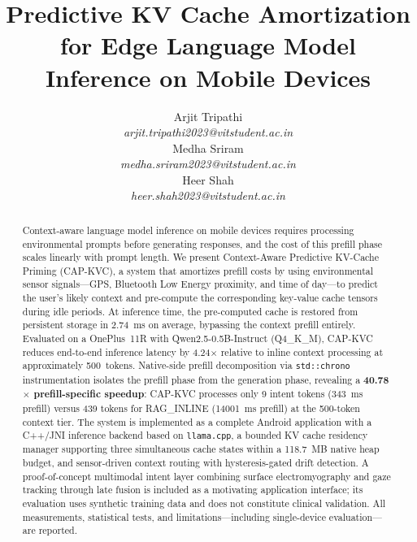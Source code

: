 \documentclass[journal]{IEEEtran}
\begin{document}
\title{Predictive KV Cache Amortization for Edge Language Model Inference on Mobile Devices}

\author{
\centering
Arjit Tripathi\\
\textit{arjit.tripathi2023@vitstudent.ac.in}

\vspace{1em}

\begin{minipage}[t]{0.45\textwidth}
\centering
Medha Sriram\\
\textit{medha.sriram2023@vitstudent.ac.in}
\end{minipage}
\hfill
\begin{minipage}[t]{0.45\textwidth}
\centering
Heer Shah\\
\textit{heer.shah2023@vitstudent.ac.in}
\end{minipage}
}

\maketitle

\begin{abstract}
Context-aware language model inference on mobile devices requires processing environmental prompts before generating responses, and the cost of this prefill phase scales linearly with prompt length. We present Context-Aware Predictive KV-Cache Priming (CAP-KVC), a system that amortizes prefill costs by using environmental sensor signals---GPS, Bluetooth Low Energy proximity, and time of day---to predict the user's likely context and pre-compute the corresponding key-value cache tensors during idle periods. At inference time, the pre-computed cache is restored from persistent storage in 2.74~ms on average, bypassing the context prefill entirely. Evaluated on a OnePlus~11R with Qwen2.5-0.5B-Instruct (Q4\_K\_M), CAP-KVC reduces end-to-end inference latency by 4.24$\times$ relative to inline context processing at approximately 500~tokens. Native-side prefill decomposition via \texttt{std::chrono} instrumentation isolates the prefill phase from the generation phase, revealing a \textbf{40.78$\times$ prefill-specific speedup}: CAP-KVC processes only 9 intent tokens (343~ms prefill) versus 439 tokens for RAG\_INLINE (14001~ms prefill) at the 500-token context tier. The system is implemented as a complete Android application with a C++/JNI inference backend based on \texttt{llama.cpp}, a bounded KV cache residency manager supporting three simultaneous cache states within a 118.7~MB native heap budget, and sensor-driven context routing with hysteresis-gated drift detection. A proof-of-concept multimodal intent layer combining surface electromyography and gaze tracking through late fusion is included as a motivating application interface; its evaluation uses synthetic training data and does not constitute clinical validation. All measurements, statistical tests, and limitations---including single-device evaluation---are reported.
\end{abstract}
\end{document}
